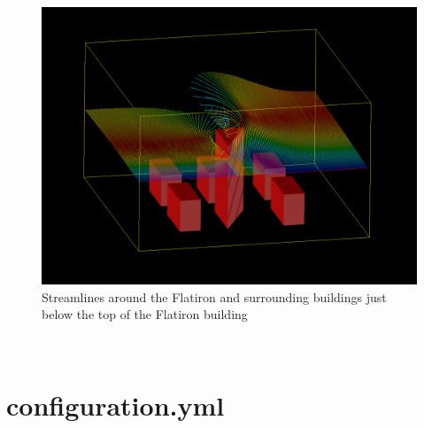 \begin{figure}[h]
\centering
\includegraphics[width = \textwidth]{streamlinestop.png}
\caption{Streamlines around the Flatiron and surrounding buildings just below the top of the Flatiron building}
\label{fig:streamlinestop}
\end{figure}\\
%
%
\section{configuration.yml}
